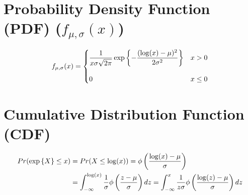 \section{Probability Density Function (PDF) ($f_{\mu,\sigma}(x)$) \cite{ism-1}} \label{Lognormal Distribution: PDF}

\[
    f_{\mu,\sigma}(x)
    = \begin{dcases}
        \dfrac{1}{x\sigma\sqrt{2\pi}}
        \exp\left\{-\dfrac{(\log(x) - \mu)^2}{2\sigma^2}\right\} & x > 0 \\[2ex]        
        0 & x \leq 0
    \end{dcases}
\]


\section{Cumulative Distribution Function (CDF) \cite{ism-1}} \label{Lognormal Distribution: CDF}

\[
\begin{aligned}
    Pr(\exp\left\{X\right\} \leq x) 
    &= Pr(X \leq \log(x))
    = \phi\left(\dfrac{\log(x) - \mu}{\sigma}\right) \\
    &= \displaystyle\int_{-\infty}^{\log(x)} \dfrac{1}{\sigma}
        \phi\left(\dfrac{z - \mu}{\sigma}\right) dz
    = \displaystyle\int_{-\infty}^{x} \dfrac{1}{z\sigma}
        \phi\left(\dfrac{\log(z) - \mu}{\sigma}\right) dz \\
\end{aligned}
\]


